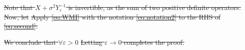 \documentclass[ba]{imsart}
\newcommand{\eps}{\varepsilon}
\newcommand{\obs}{\mathcal{O}}
\newcommand{\fwd}{\mathcal{F}}
\theoremstyle{plain}
\theoremstyle{definition}
\theoremstyle{remark}
\providecommand{\DIFdeltex}[1]{{\protect\color{red}\sout{#1}}}                      %
\providecommand{\DIFdel}[1]{\texorpdfstring{\DIFdeltex{#1}}{}} %
\begin{document}
\DIFdel{Note that $X + \sigma^2 Y_{\eps}^{-1}$ is invertible, as the sum of
   two positive definite operators. Now, let
   }%
\DIFdel{Apply \eqref{eq:WMI} with the notation \eqref{eq:notation2} to the
   RHS of \eqref{eq:second}:
  }%

\DIFdel{We conclude that $\forall \eps > 0$
  }%
\DIFdel{Letting $\eps \to 0$ completes the proof.
}%
\end{document}
